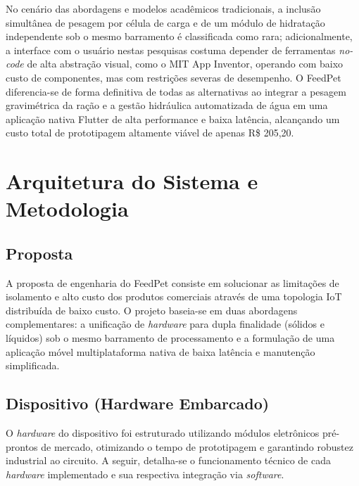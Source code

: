 \documentclass[12pt]{article}\usepackage{sbc-template}\usepackage{graphicx,url}\usepackage[utf8]{inputenc}
\begin{document}
No cenário das abordagens e modelos acadêmicos tradicionais, a inclusão simultânea de pesagem por célula de carga e de um módulo de hidratação independente sob o mesmo barramento é classificada como rara; adicionalmente, a interface com o usuário nestas pesquisas costuma depender de ferramentas \textit{no-code} de alta abstração visual, como o MIT App Inventor, operando com baixo custo de componentes, mas com restrições severas de desempenho. O FeedPet diferencia-se de forma definitiva de todas as alternativas ao integrar a pesagem gravimétrica da ração e a gestão hidráulica automatizada de água em uma aplicação nativa Flutter de alta performance e baixa latência, alcançando um custo total de prototipagem altamente viável de apenas R\$ 205,20.

\section{Arquitetura do Sistema e Metodologia}

\subsection{Proposta}
A proposta de engenharia do FeedPet consiste em solucionar as limitações de isolamento e alto custo dos produtos comerciais através de uma topologia IoT distribuída de baixo custo. O projeto baseia-se em duas abordagens complementares: a unificação de \textit{hardware} para dupla finalidade (sólidos e líquidos) sob o mesmo barramento de processamento e a formulação de uma aplicação móvel multiplataforma nativa de baixa latência e manutenção simplificada.

\subsection{Dispositivo (Hardware Embarcado)}
O \textit{hardware} do dispositivo foi estruturado utilizando módulos eletrônicos pré-prontos de mercado, otimizando o tempo de prototipagem e garantindo robustez industrial ao circuito. A seguir, detalha-se o funcionamento técnico de cada \textit{hardware} implementado e sua respectiva integração via \textit{software}.
\end{document}
